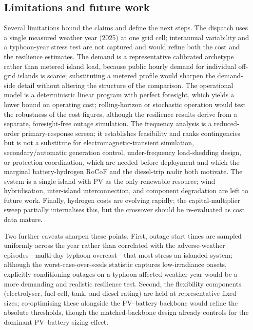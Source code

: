 \documentclass[preprint,12pt]{elsarticle}
\begin{document}
\subsection{Limitations and future work}
Several limitations bound the claims and define the next steps. The dispatch uses a
single measured weather year (2025) at one grid cell; interannual variability and a
typhoon-year stress test are not captured and would refine both the cost and the
resilience estimates. The demand is a representative calibrated archetype rather
than metered island load, because public hourly demand for individual off-grid
islands is scarce; substituting a metered profile would sharpen the demand-side
detail without altering the structure of the comparison. The operational model is a
deterministic linear program with perfect foresight, which yields a lower bound on
operating cost; rolling-horizon or stochastic operation would test the robustness of
the cost figures, although the resilience results derive from a separate,
foresight-free outage simulation. The frequency analysis is a reduced-order
primary-response screen; it establishes feasibility and ranks contingencies but is
not a substitute for electromagnetic-transient simulation, secondary/automatic
generation control, under-frequency load-shedding design, or protection
coordination, which are needed before deployment and which the marginal
battery-hydrogen RoCoF and the diesel-trip nadir both motivate. The system
is a single island with PV as the only renewable resource; wind hybridisation,
inter-island interconnection, and component degradation are left to future work.
Finally, hydrogen costs are evolving rapidly; the capital-multiplier sweep partially
internalises this, but the crossover should be re-evaluated as cost data mature.

Two further caveats sharpen these points. First, outage start times are sampled
uniformly across the year rather than correlated with the adverse-weather
episodes---multi-day typhoon overcast---that most stress an islanded system;
although the worst-case-over-seeds statistic captures low-irradiance onsets,
explicitly conditioning outages on a typhoon-affected weather year would be a more
demanding and realistic resilience test. Second, the flexibility components
(electrolyser, fuel cell, tank, and diesel rating) are held at representative fixed
sizes; co-optimising these alongside the PV--battery backbone would refine the
absolute thresholds, though the matched-backbone design already controls for the
dominant PV--battery sizing effect.
\end{document}
